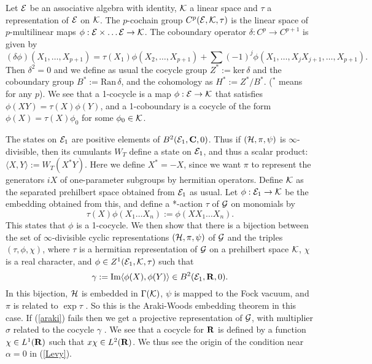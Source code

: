 Let ${\cal E}$ be an associative algebra with identity, ${\cal K}$ a linear
space and
$\tau$ a representation of ${\cal E}$ on ${\cal K}$. The $p$-cochain group
$C^p({\cal E},{\cal K},\tau)$ is the linear space of $p$-multilinear maps
$\phi:{\cal E}\times\ldots{\cal E}\rightarrow{\cal K}$. The coboundary
operator $\delta:C^p\rightarrow C^{p+1}$ is given by
\[(\delta\phi)(X_1,\ldots,X_{p+1})=\tau(X_1)\phi(X_2,\ldots,X_{p+1})+
\sum(-1)^j\phi(X_1,\ldots,X_jX_{j+1},\ldots,X_{p+1}).\]
Then $\delta^2=0$ and we define as usual the cocycle group $Z^*:=\mbox{ker}\,
\delta$ and the coboundary group $B^*:=\mbox{Ran}\,\delta$, and the
cohomology as $H^*:=Z^*/B^*$. ($^*$ means for any $p$). We see that
a 1-cocycle is a map $\phi:{\cal E}\rightarrow{\cal K}$ that satisfies
$\phi(XY)=\tau(X)\phi(Y)$, and a 1-coboundary 
is a cocycle of the form $\phi(X)=\tau(X)\phi_0$ for some $\phi_0\in
{\cal K}$.

The states on ${\cal E}_1$ are positive elements of $B^2
({\cal E}_1,{\bf C},0)$. Thus if $({\cal H},\pi,\psi)$ is
$\infty$-divisible, then its cumulants $W_T$ define a state on ${\cal E}_1$, and thus
a scalar product:
$\langle X,Y\rangle:=W_T(X^*Y)$. Here we define $X^*=-X$, since we want $\pi$
to represent the generators $iX$ of one-parameter subgroups by hermitian
operators. Define ${\cal K}$ as the separated prehilbert space obtained from
${\cal E}_1$ as usual. Let $\phi:{\cal E}_1\rightarrow{\cal K}$ be the
embedding obtained from this, and define a *-action $\tau$ of ${\cal G}$
on monomials by
\[\tau(X)\phi(X_1\ldots X_n):=\phi(XX_1\ldots X_n).\]
This states that $\phi$ is a 1-cocycle. We then show that there is a
bijection between the set of $\infty$-divisible cyclic representations
$({\cal H},\pi,\psi)$ of ${\cal G}$ and the triples $(\tau,\phi,\chi)$,
where $\tau$ is a hermitian representation of ${\cal G}$ on a prehilbert
space ${\cal K}$, $\chi$ is a real character, and
$\phi\in Z^1({\cal E}_1,{\cal K},\tau)$ such that
\begin{equation}
\gamma:=\mbox{Im}\langle\phi(X),\phi(Y)\rangle\in B^2({\cal E}_1,{\bf R},0).
\label{araki}
\end{equation}
In this bijection, ${\cal H}$ is embedded in $\Gamma({\cal K)}$, $\psi$ is
mapped to the Fock vacuum, and $\pi$ is related to $\exp\tau$ \cite{RFS4}.
So this is the Araki-Woods embedding theorem in this case.
If (\ref{araki}) fails then we get a projective representation of ${\cal G}$,
with multiplier $\sigma$ related to the cocycle $\gamma$
\cite{Mathon,Erven}. We see that a cocycle for ${\bf R}$ is defined by
a function $\chi\in L^1({\bf R})$ such that $x\chi\in L^2({\bf R})$.
We thus see the origin of the condition near $\alpha=0$ in (\ref{Levy}).


